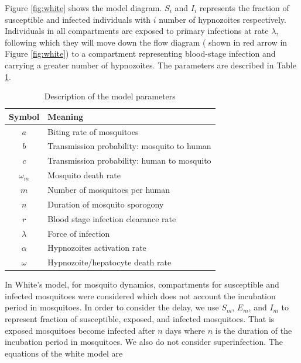 \documentclass[12pt]{article}
\begin{document}
Figure \ref{fig:white} shows the model diagram. $S_i$ and $I_i$ represents the fraction of susceptible and infected individuals with $i$ number of hypnozoites respectively. Individuals in all compartments are exposed to primary infections at rate
$\lambda$, following which they will move down the flow
diagram ( shown in red arrow in Figure \ref{fig:white}) to a compartment representing blood-stage
infection and carrying a greater number of hypnozoites. The parameters are described in Table \ref{tab:white}. 




\begin{table}[ht]
\centering
\footnotesize
\caption{Description of the model parameters\label{tab:white}}
\begin{tabular}[t]{cl}
\toprule
\textbf{Symbol} & \textbf{Meaning} \\
\midrule
$a$ & Biting rate of mosquitoes\\
\hline
$b$ & Transmission probability: mosquito to human\\
\hline
$c$ & Transmission probability: human to mosquito\\
\hline
$\omega_m$ & Mosquito death rate\\
\hline
$m$ & Number of mosquitoes per human \\ 
\hline
$n$ & Duration of mosquito sporogony\\
\hline
$r$ & Blood stage infection clearance rate\\
\hline
$\lambda$ & Force of infection\\
\hline
$\alpha$ & Hypnozoites activation rate\\
\hline
$\omega $ & Hypnozoite/hepatocyte death rate\\
\bottomrule
\end{tabular}
\end{table}

In White's model, for mosquito dynamics, compartments for susceptible and infected mosquitoes were considered which does not account the incubation period in mosquitoes. In order to consider the delay, we use $S_m$, $E_m$, and $I_m$ to represent fraction of susceptible, exposed, and infected mosquitoes. That is exposed mosquitoes become infected after $n$ days where $n$ is the duration of the incubation period in mosquitoes. We also do not consider superinfection. The equations of the white model are
\end{document}

